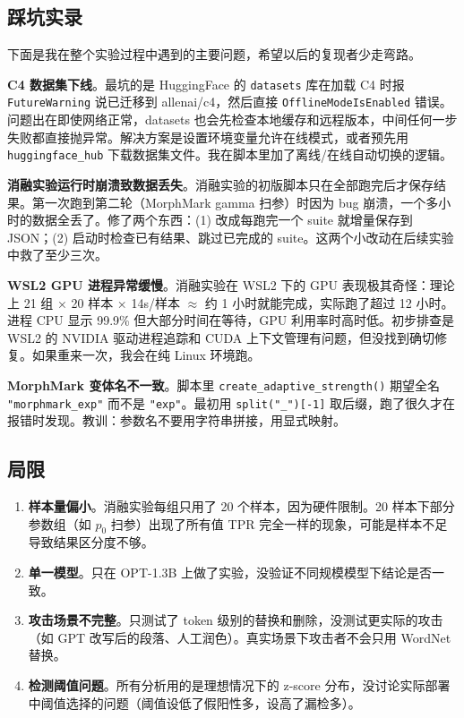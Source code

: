 \documentclass[11pt,a4paper]{article}
\begin{document}
\subsection{踩坑实录}

下面是我在整个实验过程中遇到的主要问题，希望以后的复现者少走弯路。

\textbf{C4 数据集下线}。最坑的是 HuggingFace 的 \texttt{datasets} 库在加载 C4 时报 \texttt{FutureWarning} 说已迁移到 allenai/c4，然后直接 \texttt{OfflineModeIsEnabled} 错误。问题出在即使网络正常，datasets 也会先检查本地缓存和远程版本，中间任何一步失败都直接抛异常。解决方案是设置环境变量允许在线模式，或者预先用 \texttt{huggingface\_hub} 下载数据集文件。我在脚本里加了离线/在线自动切换的逻辑。

\textbf{消融实验运行时崩溃致数据丢失}。消融实验的初版脚本只在全部跑完后才保存结果。第一次跑到第二轮（MorphMark gamma 扫参）时因为 bug 崩溃，一个多小时的数据全丢了。修了两个东西：(1) 改成每跑完一个 suite 就增量保存到 JSON；(2) 启动时检查已有结果、跳过已完成的 suite。这两个小改动在后续实验中救了至少三次。

\textbf{WSL2 GPU 进程异常缓慢}。消融实验在 WSL2 下的 GPU 表现极其奇怪：理论上 21 组 × 20 样本 × 14s/样本 $\approx$ 约 1 小时就能完成，实际跑了超过 12 小时。进程 CPU 显示 99.9\% 但大部分时间在等待，GPU 利用率时高时低。初步排查是 WSL2 的 NVIDIA 驱动进程追踪和 CUDA 上下文管理有问题，但没找到确切修复。如果重来一次，我会在纯 Linux 环境跑。

\textbf{MorphMark 变体名不一致}。脚本里 \texttt{create\_adaptive\_strength()} 期望全名 \texttt{"morphmark\_exp"} 而不是 \texttt{"exp"}。最初用 \texttt{split("\_")[-1]} 取后缀，跑了很久才在报错时发现。教训：参数名不要用字符串拼接，用显式映射。

\subsection{局限}

\begin{enumerate}[nosep]
  \item \textbf{样本量偏小}。消融实验每组只用了 20 个样本，因为硬件限制。20 样本下部分参数组（如 $p_0$ 扫参）出现了所有值 TPR 完全一样的现象，可能是样本不足导致结果区分度不够。
  \item \textbf{单一模型}。只在 OPT-1.3B 上做了实验，没验证不同规模模型下结论是否一致。
  \item \textbf{攻击场景不完整}。只测试了 token 级别的替换和删除，没测试更实际的攻击（如 GPT 改写后的段落、人工润色）。真实场景下攻击者不会只用 WordNet 替换。
  \item \textbf{检测阈值问题}。所有分析用的是理想情况下的 z-score 分布，没讨论实际部署中阈值选择的问题（阈值设低了假阳性多，设高了漏检多）。
\end{enumerate}
\end{document}
